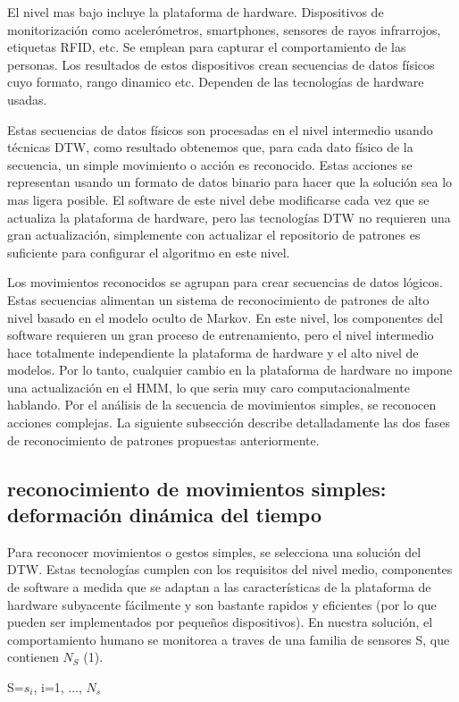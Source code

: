 \documentclass[a4paper]{article}
\begin{document}
El nivel mas bajo incluye la plataforma de hardware. Dispositivos de monitorización como acelerómetros, smartphones, sensores de rayos infrarrojos, etiquetas RFID, etc. Se emplean para capturar el comportamiento de las personas. Los resultados de estos dispositivos crean secuencias de datos físicos cuyo formato, rango dinamico etc. Dependen de las tecnologías de hardware usadas.

Estas secuencias de datos físicos son procesadas en el nivel intermedio usando técnicas DTW, como resultado obtenemos que, para cada dato físico de la secuencia, un simple movimiento o acción es reconocido. Estas acciones se representan usando un formato de datos binario para hacer que la solución sea lo mas ligera posible. El software de este nivel debe modificarse cada vez que se actualiza la plataforma de hardware, pero las tecnologías DTW no requieren una gran actualización, simplemente con actualizar el repositorio de patrones es suficiente para configurar el algoritmo en este nivel.

Los movimientos reconocidos se agrupan para crear secuencias de datos lógicos. Estas secuencias alimentan un sistema de reconocimiento de patrones de alto nivel basado en el modelo oculto de Markov. En este nivel, los componentes del software requieren un gran proceso de entrenamiento, pero el nivel intermedio hace totalmente independiente la plataforma de hardware y el alto nivel de modelos. Por lo tanto, cualquier cambio en la plataforma de hardware no impone una actualización en el HMM, lo que seria muy caro computacionalmente hablando. Por el análisis de la secuencia de movimientos simples, se reconocen acciones complejas. La siguiente subsección describe detalladamente las dos fases de reconocimiento de patrones propuestas anteriormente. 
\subsection{reconocimiento de movimientos simples: deformación dinámica del tiempo}
Para reconocer movimientos o gestos simples, se selecciona una solución del DTW. Estas tecnologías cumplen con los requisitos del nivel medio, componentes de software a medida que se adaptan a las características de la plataforma de hardware subyacente fácilmente y son bastante rapidos y eficientes (por lo que pueden ser implementados por pequeños dispositivos).
En nuestra solución, el comportamiento humano se monitorea a traves de una familia de sensores S, que contienen $N_S$ (1).
\begin{center}
S={$s_i$, i=1, ..., $N_s$}  
\end{center}
\end{document}
